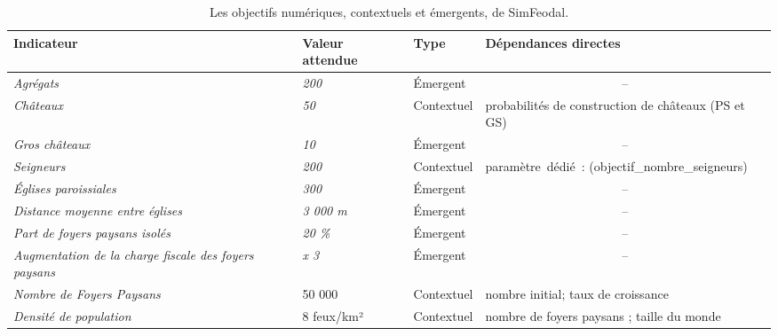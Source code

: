\begin{table}[H]
	\captionsetup{singlelinecheck=off}
	\centering
	\small
	{\renewcommand{\arraystretch}{1.3}%
	\begin{tabular}{|p{4.5cm}|p{2.1cm}|p{1.9cm}|p{4.5cm}|}
		\hline
		\textbf{Indicateur} & \textbf{Valeur attendue}\footnotemark & \textbf{Type} & \textbf{Dépendances directes}\footnotemark \\ \hline
		\textit{Agrégats} & \textit{200} & Émergent & \multicolumn{1}{c|}{--} \\ \hline
		\rowcolor[HTML]{DCDCDC} \textit{Châteaux} & \textit{50} & Contextuel & probabilités de construction de châteaux (PS et GS) \\ \hline
		\textit{Gros châteaux} & \textit{10} & Émergent & \multicolumn{1}{c|}{--} \\ \hline
		\rowcolor[HTML]{DCDCDC} \textit{Seigneurs} & \textit{200} & Contextuel & paramètre~dédié~: (\textsf{objectif\_nombre\_seigneurs}) \\ \hline
		\textit{Églises paroissiales} & \textit{300} & Émergent & \multicolumn{1}{c|}{--} \\ \hline
		\textit{Distance moyenne entre églises} & \textit{3 000 m} & Émergent & \multicolumn{1}{c|}{--} \\ \hline
		\textit{Part de foyers paysans isolés} & \textit{20 \%} & Émergent & \multicolumn{1}{c|}{--} \\ \hline
		\textit{Augmentation de la charge fiscale des foyers paysans} & \textit{x 3} & Émergent & \multicolumn{1}{c|}{--} \\ \hline
		\rowcolor[HTML]{DCDCDC} \textit{Nombre de Foyers Paysans} & 50 000 & Contextuel & nombre initial; taux de croissance\\ \hline
		\rowcolor[HTML]{DCDCDC} \textit{Densité de population} & 8 feux/km² & Contextuel & nombre de foyers paysans ; taille du monde \\ \hline
	\end{tabular}}
	\caption{Les objectifs numériques, contextuels et émergents, de SimFeodal.}
	\label{tab:objectifs-types}
\end{table}
